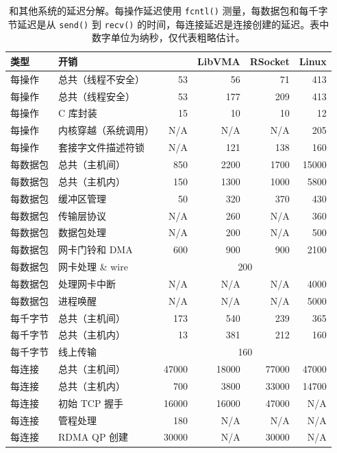 \begin{table}[htbp]
	\centering
	\small
		\begin{tabular}{l|l|r|r|r|r}
			\hline
			类型 & 开销 & \sys & LibVMA & RSocket & Linux \\
			\hline
			\hline
			每操作 & 总共（线程不安全） & 53 & 56 & 71 & 413 \\
			\hline
			每操作 & 总共（线程安全） & 53 & 177 & 209 & 413 \\
			\hline
			每操作 & C 库封装 & 15 & 10 & 10 & 12 \\
			\hline
			每操作 & 内核穿越（系统调用） & N/A & N/A & N/A & 205 \\
			\hline
			每操作 & 套接字文件描述符锁 & N/A & 121 & 138 & 160 \\
			\hline
			\hline
			每数据包 & 总共（主机间） & 850 & 2200 & 1700 & 15000 \\
			\hline
			每数据包 & 总共（主机内） & 150 & 1300 & 1000 & 5800 \\
			\hline
			每数据包 & 缓冲区管理 & 50 & 320 & 370 & 430 \\
			\hline
			每数据包 & 传输层协议 & N/A & 260 & N/A & 360 \\
			\hline
			每数据包 & 数据包处理 & N/A & 200 & N/A & 500 \\
			\hline
			每数据包 & 网卡门铃和 DMA & 600 & 900 & 900 & 2100 \\
			\hline
			每数据包 & 网卡处理 \& wire & \multicolumn{4}{c}{200} \\
			\hline
			每数据包 & 处理网卡中断 & N/A & N/A & N/A & 4000 \\
			\hline
			每数据包 & 进程唤醒 & N/A & N/A & N/A & 5000 \\
			\hline
			\hline
			每千字节 & 总共（主机间）& 173 & 540 & 239 & 365 \\
			\hline
			每千字节 & 总共（主机内） & 13 & 381 & 212 & 160 \\
			\hline
			每千字节 & 线上传输 & \multicolumn{4}{c}{160} \\
			\hline
			\hline
			每连接 & 总共（主机间）& 47000 & 18000 & 77000 & 47000 \\
			\hline
			每连接 & 总共（主机内） & 700 & 3800 & 33000 & 14700 \\
			\hline
			每连接 & 初始 TCP 握手 & 16000 & 16000 & 47000 & N/A \\
			\hline
			每连接 & 管程处理 & 180 & N/A & N/A & N/A \\
			\hline
			每连接 & RDMA QP 创建 & 30000 & N/A & 30000 & N/A \\
			\hline
		\end{tabular}
	\caption{\sys{} 和其他系统的延迟分解。每操作延迟使用 \texttt{fcntl()} 测量，每数据包和每千字节延迟是从 \texttt{send()} 到 \texttt{recv()} 的时间，每连接延迟是连接创建的延迟。表中数字单位为纳秒，仅代表粗略估计。}
	\label{tab:microbenchmark}
\end{table}


